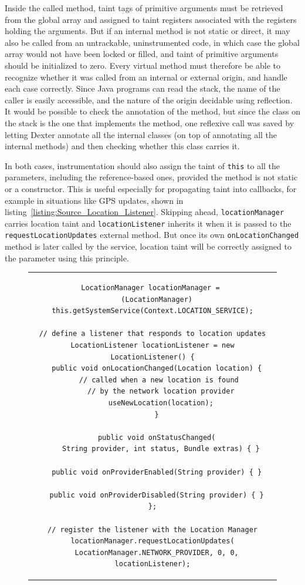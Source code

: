 \documentclass[12pt,twoside,notitlepage]{report}
\begin{document}
Inside the called method, taint tags of primitive arguments must be retrieved from the global array and assigned to taint registers associated with the registers holding the arguments. But if an internal method is not static or direct, it may also be called from an untrackable, uninstrumented code, in which case the global array would not have been locked or filled, and taint of primitive arguments should be initialized to zero. Every virtual method must therefore be able to recognize whether it was called from an internal or external origin, and handle each case correctly. Since Java programs can read the stack, the name of the caller is easily accessible, and the nature of the origin decidable using reflection. It would be possible to check the annotation of the method, but since the class on the stack is the one that implements the method, one reflexive call was saved by letting Dexter annotate all the internal classes (on top of annotating all the internal methods) and then checking whether this class carries it. 

In both cases, instrumentation should also assign the taint of \verb$this$ to all the parameters, including the reference-based ones, provided the method is not static or a constructor. This is useful especially for propagating taint into callbacks, for example in situations like GPS updates, shown in listing~\ref{listing:Source_Location_Listener}. Skipping ahead, \verb$locationManager$ carries location taint and \verb$locationListener$ inherits it when it is passed to the \verb$requestLocationUpdates$ external method. But once its own \verb$onLocationChanged$ method is later called by the service, location taint will be correctly assigned to the parameter using this principle. 

\begin{figure}
	\centering
	\begin{tabular}{c}
	\begin{lstlisting}
LocationManager locationManager = 
  (LocationManager) this.getSystemService(Context.LOCATION_SERVICE);

// define a listener that responds to location updates
LocationListener locationListener = new LocationListener() {
  public void onLocationChanged(Location location) {
    // called when a new location is found 
    // by the network location provider
    useNewLocation(location);
  }

  public void onStatusChanged(
    String provider, int status, Bundle extras) { }

  public void onProviderEnabled(String provider) { }

  public void onProviderDisabled(String provider) { }
};

// register the listener with the Location Manager
locationManager.requestLocationUpdates(
  LocationManager.NETWORK_PROVIDER, 0, 0, locationListener);
	\end{lstlisting}
	\end{tabular}
	\begin{lstlisting}[caption={Example of a location-updating callback class},
	                   label={listing:Source_Location_Listener}]
	\end{lstlisting}
\end{figure}
\end{document}
